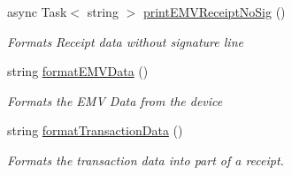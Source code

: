 \begin{DoxyCompactItemize}
async Task$<$ string $>$ \mbox{\hyperlink{class_cert_complete_1_1_innowi_device_a729ebb4b3a441a7dfb218ffbd3b31c86}{print\+E\+M\+V\+Receipt\+No\+Sig}} ()
\begin{DoxyCompactList}\small\item\em Formats Receipt data without signature line \end{DoxyCompactList}\item 
string \mbox{\hyperlink{class_cert_complete_1_1_innowi_device_aad620bfcbd0417cc415585372baa8112}{format\+E\+M\+V\+Data}} ()
\begin{DoxyCompactList}\small\item\em Formats the E\+MV Data from the device \end{DoxyCompactList}\item 
string \mbox{\hyperlink{class_cert_complete_1_1_innowi_device_a9db23bf8f2599eea59d391bcad2b8193}{format\+Transaction\+Data}} ()
\begin{DoxyCompactList}\small\item\em Formats the transaction data into part of a receipt. \end{DoxyCompactList}\end{DoxyCompactItemize}
